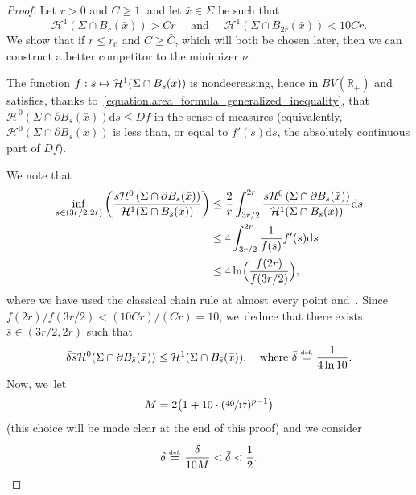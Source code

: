 \documentclass[10pt]{amsart}
\newcommand\mto{\mathchoice{\longmapsto}{\mapsto}{\mapsto}{\mapsto}}
\theoremstyle{definition}
\newcommand{\eqdef}{\ensuremath{\stackrel{\mbox{\upshape\tiny def.}}{=}}}
\newcommand\cH{\mathcal{H}}
\newcommand{\RR}{\mathbb{R}}
\newcommand\dd{\mathrm{d}}
\begin{document}
\begin{proof}
Let $r> 0$ and $C\ge 1$, and let $\bar x\in\Sigma$ be such that
\begin{equation}\label{eq.bounds_length}
\cH^1(\Sigma\cap B_r(\bar x))> Cr
\quad \text{ and }\quad
\cH^1(\Sigma\cap B_{2r}(\bar x))< 10Cr.
\end{equation}
We show that if $r\le r_0$ and $C\ge \bar C$, which will both be chosen later, then we can construct a better competitor to the minimizer $\nu$.

The function $f: s \mto \cH^1(\Sigma\cap B_s(\bar x))$ is nondecreasing, hence
in $BV(\RR_+)$ and satisfies, thanks to~\eqref{equation.area_formula_generalized_inequality}, that $\cH^0(\Sigma\cap \partial B_s(\bar x))\dd s\le Df$ in the sense of measures
(equivalently, $\cH^0(\Sigma\cap\partial B_s(\bar x))$ is less than, or equal to $f'(s)\dd s$, the absolutely continuous part of $Df$).

We note that
\begin{align*}
\inf_{s \in (3r/2,2r)} \left(\frac{s\cH^0\left(\Sigma\cap\partial B_s(\bar x)\right)}{\cH^1(\Sigma\cap B_{s}(\bar x))}\right)
&\le \frac{2}{r}\int_{3r/2}^{2r}\frac{s\cH^0\left(\Sigma\cap\partial B_s(\bar x)\right)}{\cH^1(\Sigma\cap B_{ s}(\bar x))} \dd s\\
&\le 4\int_{3r/2}^{2r} \frac{1}{f(s)} f'(s)\dd s \\
&\leq 4\ln \Bigl(\frac{f(2r)}{f(3r/2)}\Bigr),
\end{align*}
where we have used the classical chain rule at almost every point and~\cite[Cor.\,3.29]{ambrosio2000functions}. Since $f(2r)/f(3r/2)<(10Cr)/(Cr)=10$, we~deduce that there exists $\bar s\in (3r/2,2r)$ such that
\begin{equation}\label{eq:estimbars}
\bar\delta \bar s\cH^0(\Sigma\cap\partial B_{\bar s}(\bar x)) \le \cH^1(\Sigma\cap B_{\bar s}(\bar x)), \quad \text{where }\bar \delta \eqdef \frac{1}{4\ln 10}.
\end{equation}
Now, we~let
\begin{equation}\label{eq:M}
M= 2 \bigl( 1+10\cdot(\sfrac{40}{17})^{p-1} \bigr)
\end{equation}
(this choice will be made clear at the end of this proof) and we consider
\begin{equation}\label{eq:delta}
\delta \eqdef \frac{\bar\delta}{10M} <\bar \delta<\frac{1}{2}.
\end{equation}


\end{proof}
\end{document}
